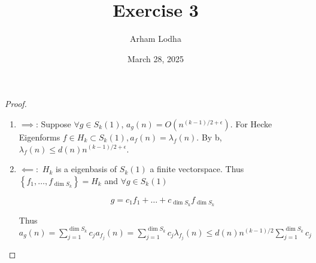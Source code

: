 \documentclass{article}
\begin{document}
\title{Exercise 3}
\author{Arham Lodha}%
\date{March 28, 2025}%
\maketitle

\begin{proof}
    \begin{enumerate}
        \item $\implies$: Suppose $\forall g \in S_{k}(1)$, $a_{g}(n) = O(n^{(k - 1) / 2 + \epsilon})$. For Hecke Eigenforms $f \in H_{k} \subset S_k(1), a_f(n) = \lambda_f(n)$. By b, $\lambda_f(n) \leq d(n)n^{(k - 1)/2 + \epsilon}$. 
        \item $\impliedby:$ $H_k$ is a eigenbasis of $S_k(1)$ a finite vectorspace. Thus $\left\{ f_1, \dots, f_{\dim S_k} \right\} = H_k$ and $\forall g \in S_{k}(1)$
        
        \[g = c_{1} f_1 + \hdots + c_{\dim S_k} f_{\dim S_k}\]

        Thus $a_{g}(n) = \sum_{j = 1}^{\dim S_k} c_j a_{f_j}(n) = \sum_{j = 1}^{\dim S_k} c_j \lambda_{f_j}(n) \leq d(n)n^{(k - 1)/2} \sum_{j = 1}^{\dim S_k} c_j$ 
    \end{enumerate}
     
\end{proof}
\end{document}
